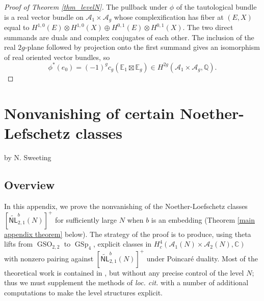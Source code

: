 \documentclass[12pt]{amsart}
\def\cA{\mathcal{A}}
\def\bE{\mathbb{E}}
\def\bQ{\mathbb{Q}}
\newcommand{\A}{\mathcal A}
\newcommand{\km}{\mathrm{km}}
\newtheorem{thm}{Theorem}[section]
\theoremstyle{definition}
\newcommand{\CL}[1]{{\color{blue}CL: #1}}
\newcommand{\Z}{\mathbb{Z}}
\newcommand{\C}{\mathbb{C}}
\DeclareMathOperator{\GSp}{GSp}
\begin{document}
\begin{proof}[Proof of Theorem \ref{thm_levelN}]
The pullback under $\phi$ of the tautological bundle is a real vector bundle on $\A_1\times \A_g$ whose complexification has fiber at $(E,X)$ equal to $H^{1,0}(E)\otimes H^{1,0}(X) \oplus H^{0,1}(E)\otimes H^{0,1}(X)$.  The two direct summands are duals and complex conjugates of each other. The inclusion of the real $2g$-plane followed by projection onto the first summand gives an isomorphism of real oriented vector bundles, so $$\phi^*(e_0) = (-1)^g c_g(\bE_1 \boxtimes \bE_g) \in H^{2g}(\A_1\times \A_g,\bQ).$$
\end{proof}


\appendix \label{appendix}
\section{Nonvanishing of certain Noether-Lefschetz classes}
\begin{center}
by N. Sweeting
\end{center}

\subsection{Overview}
In this appendix, we prove the nonvanishing of the Noether-Loefschetz classes $[\widetilde{\mathsf{NL}}_{2,1}^b(N)]^+$ for sufficiently large $N$ when $b$ is an embedding (Theorem \ref{main appendix theorem} below).
The strategy of the proof is to produce, using theta lifts from $\operatorname{GSO}_{2,2}$ to $\GSp_4$, explicit classes in $H^4_c(\mathcal A_1(N)\times \mathcal A_2(N), \C)$ with nonzero pairing against $[\widetilde{\mathsf{NL}}_{2,1}^b(N)]^+$ under Poincar\'e duality. Most of the theoretical work is contained in \cite[Theorems A and C]{sweeting2022tateclassesendoscopyoperatornamegsp4}, but without any precise control of the level $N$; thus we must supplement the methods of \emph{loc. cit.} with a number of additional computations to make the level structures explicit. 
\end{document}
